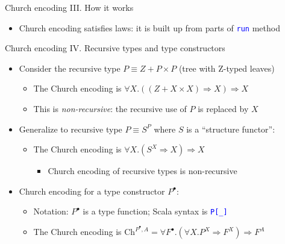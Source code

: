 \documentclass[english,,russian]{beamer}
\begin{document}
\begin{frame}{Church encoding III. How it works}
\begin{itemize}
\begin{itemize}
and \texttt{\textcolor{blue}{\footnotesize{}Id}} 
\begin{itemize}
\item Naturality of \texttt{\textcolor{blue}{\footnotesize{}ch.run}} follows
from parametricity of its code
\end{itemize}
\item It is straightforward to compute \texttt{\textcolor{blue}{\footnotesize{}c2a(a2c(a))
= identity(a) = a}} 
\end{itemize}
\item Church encoding satisfies laws: it is built up from parts of \texttt{\textcolor{blue}{\footnotesize{}run}}
method
\end{itemize}
\end{frame}

\begin{frame}{Church encoding IV. Recursive types and type constructors}
\begin{itemize}
\item Consider the recursive type $P\equiv Z+P\times P$ (tree with Z-typed
leaves)
\begin{itemize}
\item The Church encoding is {\footnotesize{}$\forall X.\left(\left(Z+X\times X\right)\Rightarrow X\right)\Rightarrow X$}{\footnotesize\par}
\item This is \emph{non-recursive}: the recursive use of $P$ is replaced
by $X$
\end{itemize}
\item Generalize to recursive type $P\equiv S^{P}$ where $S$ is a ``structure
functor'':
\begin{itemize}
\item The Church encoding is {\footnotesize{}$\forall X.\left(S^{X}\Rightarrow X\right)\Rightarrow X$}{\footnotesize\par}
\begin{itemize}
\item Church encoding of recursive types is non-recursive
\end{itemize}
\end{itemize}
\item Church encoding for a type constructor $P^{\bullet}$:
\begin{itemize}
\item Notation: $P^{\bullet}$ is a type function; Scala syntax is \texttt{\textcolor{blue}{\footnotesize{}P{[}\_{]}}} 
\item The Church encoding is {\footnotesize{}$\text{Ch}^{P^{\bullet},A}=\forall F^{\bullet}.\left(\forall X.P^{X}\Rightarrow F^{X}\right)\Rightarrow F^{A}$}{\footnotesize\par}

\end{itemize}
\end{itemize}
\end{frame}
\end{document}
